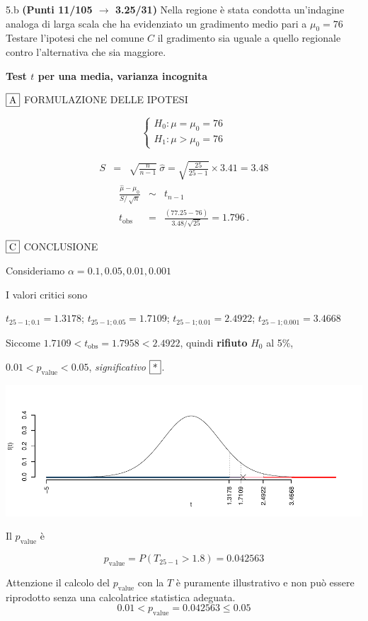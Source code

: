 \documentclass[
  11pt,
]{book}
\theoremstyle{mytheoremstyle}
\theoremstyle{mydefstyle}
\newenvironment{sol}
  {
  \begin{tcolorbox}[enhanced,breakable,arc=0.1mm,boxrule=1pt,colback=white,colframe=iblue,
  title=\bf \fontfamily{lmss}\selectfont \hspace{.5 cm} Soluzione,drop fuzzy shadow]

}{
\end{tcolorbox}
  }
\begin{document}
5.b \textbf{(Punti 11/105 \(\rightarrow\) 3.25/31)} Nella regione è stata condotta un'indagine analoga
di larga scala che ha evidenziato un gradimento medio pari a \(\mu_0=76\)
Testare l'ipotesi che nel comune \(C\) il gradimento sia uguale a quello regionale contro l'alternativa che sia maggiore.

\begin{sol}
\textbf{Test \(t\) per una media, varianza incognita}

\(\fbox{A}\) FORMULAZIONE DELLE IPOTESI

\[\begin{cases}
   H_0: \mu = \mu_0=76 \\
   H_1: \mu > \mu_0=76 
   \end{cases}\]

\begin{eqnarray*}
   S    &=& \sqrt{\frac{n} {n-1}}\ \widehat{\sigma} 
   =  \sqrt{\frac{ 25 } { 25 -1}} \times  3.41  =  3.48 
   \end{eqnarray*}
\begin{eqnarray*}
   \frac{\hat\mu - \mu_{0}} {S/\,\sqrt{n}}&\sim&t_{n-1}\\
   t_{\text{obs}}
   &=& \frac{ ( 77.25 -  76 )} { 3.48 /\sqrt{ 25 }}
   =   1.796 \, .
   \end{eqnarray*}

\(\fbox{C}\) CONCLUSIONE

Consideriamo \(\alpha=0.1, 0.05, 0.01, 0.001\)

I valori critici sono

\(t_{25-1;0.1}=1.3178\); \(t_{25-1;0.05}=1.7109\); \(t_{25-1;0.01}=2.4922\); \(t_{25-1;0.001}=3.4668\)

Siccome \(1.7109<t_\text{obs}=1.7958<2.4922\), quindi \textbf{rifiuto} \(H_0\) al 5\%,

\(0.01<p_\text{value}<0.05\), \emph{significativo} \(\fbox{*}\).

\begin{center}\includegraphics{Esami_passati_con_soluzioni_files/figure-latex/2023-81,-1} \end{center}

Il \(p_{\text{value}}\) è

\[ p_{\text{value}} = P(T_{25-1}>1.8)=0.042563 \]

Attenzione il calcolo del \(p_\text{value}\) con la \(T\) è puramente illustrativo e non può essere riprodotto senza una calcolatrice statistica adeguata.\[
 0.01 < p_\text{value}= 0.042563 \leq 0.05 
\]

\end{sol}
\end{document}
